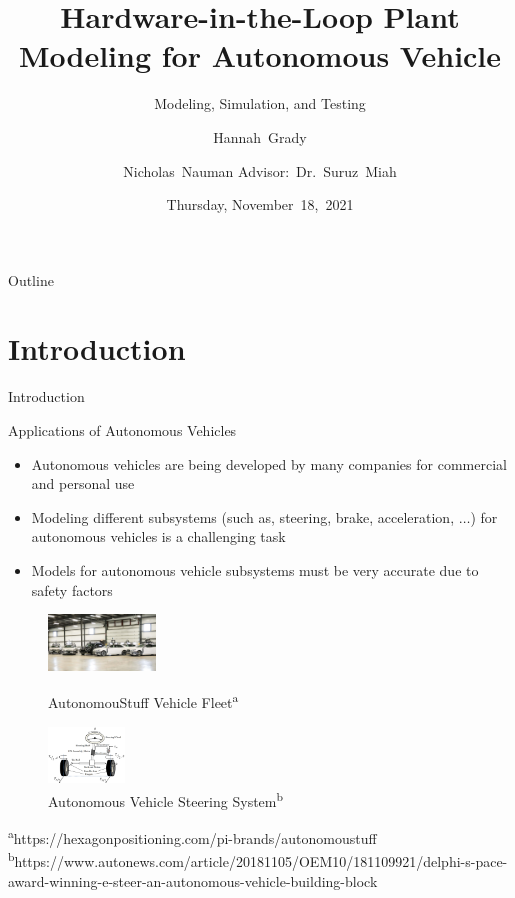 \documentclass{beamer}
\title[HIL Plant Modeling]{Hardware-in-the-Loop Plant Modeling for Autonomous
  Vehicle}
\subtitle{Modeling, Simulation, and Testing}
\author[H.~Grady, N.~Nauman]{Hannah~Grady \and Nicholas~Nauman 
\linebreak Advisor:~Dr.~Suruz~Miah}
\institute[Bradley University] %
{
  Department of Electrical and Computer Engineering\\
  Bradley University\\
  1501 W. Bradley Avenue\\
  Peoria, IL, 61625, USA
}
\date[November~18,~2021]{Thursday, November~18,~2021}
\begin{document}
\begin{frame}
  \titlepage
\end{frame}

\begin{frame}{Outline} 
  \tableofcontents%
\end{frame}

\section{Introduction}

\begin{frame}{Introduction}{}
    \begin{block}{Applications of Autonomous Vehicles}
    	\begin{itemize}
    		\item Autonomous vehicles are being developed by many companies for commercial and personal use
    		\item Modeling different subsystems (such as, steering, brake,
          acceleration, $\ldots$)  for autonomous vehicles is a challenging task
     		\item Models for autonomous vehicle subsystems must be very accurate due to safety factors
		\end{itemize}
    \end{block}
        \begin{figure}
			\centering
			\begin{minipage}[t]{0.4\textwidth}
				\centering
				\includegraphics[height=1.5cm]{figs/img/autonomousVehiclesAStuff}
				\caption{AutonomouStuff Vehicle Fleet\textsuperscript{a}}
				\label{fig:fleet}
			\end{minipage}
			\begin{minipage}[t]{0.4\textwidth}
				\centering
				\includegraphics[height=1.5cm]{figs/img/autonomousVehiclesSteering}
				\caption{Autonomous Vehicle Steering System\textsuperscript{b}}
				\label{fig:steerSystem}
			\end{minipage}
        \end{figure}
    \begin{tiny}
		\textsuperscript{a}https://hexagonpositioning.com/pi-brands/autonomoustuff\\\textsuperscript{b}https://www.autonews.com/article/20181105/OEM10/181109921/delphi-s-pace-award-winning-e-steer-an-autonomous-vehicle-building-block
    \end{tiny}
\end{frame}
\end{document}
